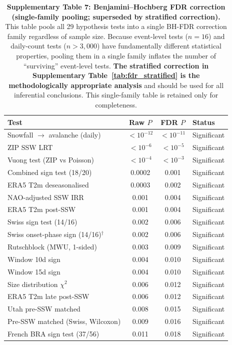 \documentclass[11pt,letterpaper]{article}
\begin{document}
\begin{table}[!ht]
\centering
\caption{\textbf{Supplementary Table 7: Benjamini--Hochberg FDR correction (single-family pooling; superseded by stratified correction).}
This table pools all 29 hypothesis tests into a single BH-FDR correction family regardless of sample size. Because event-level tests ($n = 16$) and daily-count tests ($n > 3{,}000$) have fundamentally different statistical properties, pooling them in a single family inflates the number of ``surviving'' event-level tests. \textbf{The stratified correction in Supplementary Table~\ref{tab:fdr_stratified} is the methodologically appropriate analysis} and should be used for all inferential conclusions. This single-family table is retained only for completeness.}
\label{stab:fdr}
\small
\begin{tabular}{lccl}
\toprule
Test & Raw $P$ & FDR $P$ & Status \\
\midrule
Snowfall $\to$ avalanche (daily) & $<10^{-12}$ & $<10^{-11}$ & Significant \\
ZIP SSW LRT & $<10^{-6}$ & $<10^{-5}$ & Significant \\
Vuong test (ZIP vs Poisson) & $<10^{-4}$ & $<10^{-3}$ & Significant \\
Combined sign test (18/20) & 0.0002 & 0.001 & Significant \\
ERA5 T2m deseasonalised & 0.0003 & 0.002 & Significant \\
NAO-adjusted SSW IRR & 0.001 & 0.004 & Significant \\
ERA5 T2m post-SSW & 0.001 & 0.004 & Significant \\
Swiss sign test (14/16) & 0.002 & 0.006 & Significant \\
Swiss onset-phase sign (14/16)$^\dag$ & 0.002 & 0.006 & Significant \\
Rutschblock (MWU, 1-sided) & 0.003 & 0.009 & Significant \\
Window 10d sign & 0.004 & 0.010 & Significant \\
Window 15d sign & 0.004 & 0.010 & Significant \\
Size distribution $\chi^2$ & 0.006 & 0.012 & Significant \\
ERA5 T2m late post-SSW & 0.006 & 0.012 & Significant \\
Utah pre-SSW matched & 0.008 & 0.015 & Significant \\
Pre-SSW matched (Swiss, Wilcoxon) & 0.009 & 0.016 & Significant \\
French BRA sign test (37/56) & 0.011 & 0.018 & Significant \\

\end{tabular}
\end{table}
\end{document}

